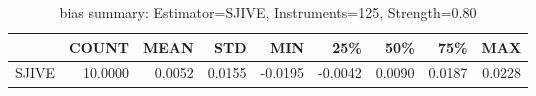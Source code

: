\begin{table}[ht]
\centering
\caption{bias summary: Estimator=SJIVE, Instruments=125, Strength=0.80}
\begin{tabular}{lrrrrrrrr}
\toprule
 & COUNT & MEAN & STD & MIN & 25\% & 50\% & 75\% & MAX \\
\midrule
SJIVE & 10.0000 & 0.0052 & 0.0155 & -0.0195 & -0.0042 & 0.0090 & 0.0187 & 0.0228 \\
\bottomrule
\end{tabular}
\end{table}
